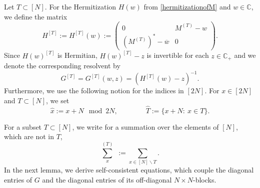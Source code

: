 \documentclass[10pt,a4paper]{amsart}
\newcommand{\C}{\mathbb{C}}
\numberwithin{equation}{section}
\newcommand*\bset[1]{[#1]}
\newcommand*\ubarr[1]{{\widehat{#1}}}
\begin{document}
	
	Let $T \subset [N]$. For the Hermitization $H(w)$ from \cref{hermitizationofM} and $w \in \C$, 
	we define the matrix 
	\begin{equation}\label{hermitizationofM(T)}
		H^{\bset{T}}:= H^{\bset{T}}(w) :=\left(
		\begin{array}{ccc}
			0                       &       M^{(T)}-w \\
			
			(M^{(T)})^{\ast}- \overline{w}  & 0
		\end{array}
		\right).
	\end{equation}
	Since $H(w)^{[T]}$ is Hermitian, $H(w)^{[T]}-z$ is invertible for each $z \in \C_+$ and we denote the 
	corresponding resolvent by 
	\begin{equation}\label{eq:GreenfunctionM(T)}
		G^{\bset{T}}=G^{\bset{T}}(w,z) = (H^{\bset{T}}(w)- z)^{-1}.
	\end{equation}
	Furthermore, we use the following notion for the indices in $[2N]$. For $x \in [2N]$ and $T \subset [N]$, we set
	\begin{equation*}
		\ubarr{x}:= x+N \mod 2N, \qquad \qquad \ubarr{T}:= \{ x + N:~ x \in T\}.
	\end{equation*}
	
	For a subset $T \subset [N]$, we write for a summation over the elements of $[N]$, which are not in $T$, 
	\begin{equation*}
		\sum_{x}^{(T)} \,\, := \sum_{x \in [N]\backslash T}.
	\end{equation*}
In the next lemma, we derive self-consistent equations, which couple the diagonal entries of $G$ and the diagonal entries of its off-diagonal $N \times N$-blocks.  
	
\end{document}
